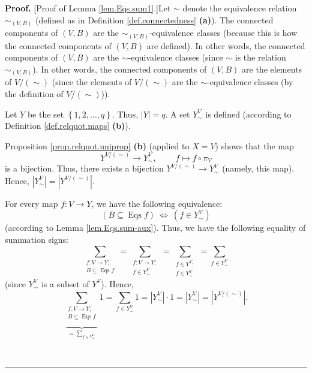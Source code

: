 \documentclass[numbers=enddot,12pt,final,onecolumn,notitlepage]{scrartcl}%
\theoremstyle{definition}
\newenvironment{proof}[1][Proof]{\noindent\textbf{#1.} }{\ \rule{0.5em}{0.5em}}
\newenvironment{verlong}{}{}
\let\sumnonlimits\sum
\renewcommand{\sum}{\sumnonlimits\limits}
\begin{document}
\begin{verlong}
\begin{proof}
[Proof of Lemma \ref{lem.Eqs.sum1}.]Let $\sim$ denote the equivalence relation
$\sim_{\left(  V,B\right)  }$ (defined as in Definition
\ref{def.connectedness} \textbf{(a)}). The connected components of $\left(
V,B\right)  $ are the $\sim_{\left(  V,B\right)  }$-equivalence classes
(because this is how the connected components of $\left(  V,B\right)  $ are
defined). In other words, the connected components of $\left(  V,B\right)  $
are the $\sim$-equivalence classes (since $\sim$ is the relation
$\sim_{\left(  V,B\right)  }$). In other words, the connected components of
$\left(  V,B\right)  $ are the elements of $V/\left(  \sim\right)  $ (since
the elements of $V/\left(  \sim\right)  $ are the $\sim$-equivalence classes
(by the definition of $V/\left(  \sim\right)  $)).

Let $Y$ be the set $\left\{  1,2,\ldots,q\right\}  $. Thus, $\left\vert
Y\right\vert =q$. A set $Y_{\sim}^{V}$ is defined (according to Definition
\ref{def.relquot.maps} \textbf{(b)}).

Proposition \ref{prop.relquot.uniprop} \textbf{(b)} (applied to $X=V$) shows
that the map%
\[
Y^{V/\left(  \sim\right)  }\rightarrow Y_{\sim}^{V}%
,\ \ \ \ \ \ \ \ \ \ f\mapsto f\circ\pi_{V}%
\]
is a bijection. Thus, there exists a bijection $Y^{V/\left(  \sim\right)
}\rightarrow Y_{\sim}^{V}$ (namely, this map). Hence, $\left\vert Y_{\sim}%
^{V}\right\vert =\left\vert Y^{V/\left(  \sim\right)  }\right\vert $.

For every map $f:V\rightarrow Y$, we have the following equivalence:%
\begin{equation}
\left(  B\subseteq\operatorname*{Eqs}f\right)  \ \Longleftrightarrow\ \left(
f\in Y_{\sim}^{V}\right)  \label{pf.lem.Eqs.sum1.equivalence}%
\end{equation}
(according to Lemma \ref{lem.Eqs.sum-aux}). Thus, we have the following
equality of summation signs:
\[
\sum_{\substack{f:V\rightarrow Y;\\B\subseteq\operatorname*{Eqs}f}%
}=\sum_{\substack{f:V\rightarrow Y;\\f\in Y_{\sim}^{V}}}=\sum_{\substack{f\in
Y^{V};\\f\in Y_{\sim}^{V}}}=\sum_{f\in Y_{\sim}^{V}}%
\]
(since $Y_{\sim}^{V}$ is a subset of $Y^{V}$). Hence,%
\begin{equation}
\underbrace{\sum_{\substack{f:V\rightarrow Y;\\B\subseteq\operatorname*{Eqs}%
f}}}_{=\sum_{f\in Y_{\sim}^{V}}}1=\sum_{f\in Y_{\sim}^{V}}1=\left\vert
Y_{\sim}^{V}\right\vert \cdot1=\left\vert Y_{\sim}^{V}\right\vert =\left\vert
Y^{V/\left(  \sim\right)  }\right\vert . \label{pf.lem.Eqs.sum1.1}%
\end{equation}



\end{proof}
\end{verlong}
\end{document}
